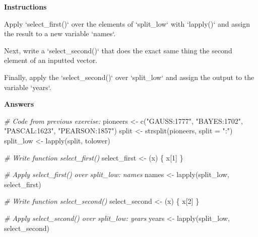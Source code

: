 \documentclass[]{article}
\newcommand{\hlnum}[1]{\textcolor[rgb]{0.816,0.125,0.439}{#1}}%
\newcommand{\hlstr}[1]{\textcolor[rgb]{0.251,0.627,0.251}{#1}}%
\newcommand{\hlcom}[1]{\textcolor[rgb]{0.502,0.502,0.502}{\textit{#1}}}%
\newcommand{\hlstd}[1]{\textcolor[rgb]{0.251,0.251,0.251}{#1}}%
\newcommand{\hlkwc}[1]{\textcolor[rgb]{0.251,0.251,0.251}{#1}}%
\newcommand{\hlkwd}[1]{\textcolor[rgb]{0.878,0.439,0.125}{#1}}%
\newenvironment{Shaded}{\begin{myshaded}}{\end{myshaded}}
\newcommand{\KeywordTok}[1]{\hlkwd{#1}}
\newcommand{\DataTypeTok}[1]{\hlkwc{#1}}
\newcommand{\DecValTok}[1]{\hlnum{#1}}
\newcommand{\StringTok}[1]{\hlstr{#1}}
\newcommand{\CommentTok}[1]{\hlcom{#1}}
\newcommand{\NormalTok}[1]{\hlstd{#1}}
\begin{document}
\textbf{Instructions}

\begin{Shaded}
\begin{Highlighting}[]
\OperatorTok{*}\StringTok{ }\NormalTok{Apply }\StringTok{`}\DataTypeTok{select_first()}\StringTok{`}\NormalTok{ over the elements of }\StringTok{`}\DataTypeTok{split_low}\StringTok{`}\NormalTok{ with }\StringTok{`}\DataTypeTok{lapply()}\StringTok{`}\NormalTok{ and assign the result to a new variable }\StringTok{`}\DataTypeTok{names}\StringTok{`}\NormalTok{.}

\OperatorTok{*}\StringTok{ }\NormalTok{Next, write a } \StringTok{`}\DataTypeTok{select_second()}\StringTok{`}\NormalTok{ that does the exact same thing }\NormalTok{ the second element of an inputted vector.}

\OperatorTok{*}\StringTok{ }\NormalTok{Finally, apply the }\StringTok{`}\DataTypeTok{select_second()}\StringTok{`} \NormalTok{ over }\StringTok{`}\DataTypeTok{split_low}\StringTok{`}\NormalTok{ and assign the output to the variable }\StringTok{`}\DataTypeTok{years}\StringTok{`}\NormalTok{.}
\end{Highlighting}
\end{Shaded}

\textbf{Answers}

\begin{Shaded}
\begin{Highlighting}[]
\CommentTok{# Code from previous exercise:}
\NormalTok{pioneers <-}\StringTok{ }\KeywordTok{c}\NormalTok{(}\StringTok{"GAUSS:1777"}\NormalTok{, }\StringTok{"BAYES:1702"}\NormalTok{, }\StringTok{"PASCAL:1623"}\NormalTok{, }\StringTok{"PEARSON:1857"}\NormalTok{)}
\NormalTok{split <-}\StringTok{ }\KeywordTok{strsplit}\NormalTok{(pioneers, }\DataTypeTok{split =} \StringTok{":"}\NormalTok{)}
\NormalTok{split_low <-}\StringTok{ }\KeywordTok{lapply}\NormalTok{(split, tolower)}

\CommentTok{# Write function select_first()}
\NormalTok{select_first <-}\StringTok{ }\NormalTok{(x) \{}
\NormalTok{  x[}\DecValTok{1}\NormalTok{]}
\NormalTok{\}}

\CommentTok{# Apply select_first() over split_low: names}
\NormalTok{names <-}\StringTok{ }\KeywordTok{lapply}\NormalTok{(split_low, select_first)}

\CommentTok{# Write function select_second()}
\NormalTok{select_second <-}\StringTok{ }\NormalTok{(x) \{}
\NormalTok{  x[}\DecValTok{2}\NormalTok{]}
\NormalTok{\}}



\CommentTok{# Apply select_second() over split_low: years}
\NormalTok{years <-}\StringTok{ }\KeywordTok{lapply}\NormalTok{(split_low, select_second)}
\end{Highlighting}
\end{Shaded}
\end{document}
